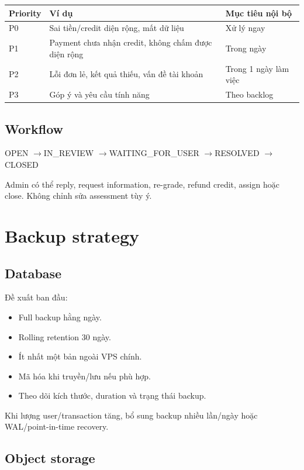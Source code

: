 \documentclass[11pt,a4paper]{article}
\newcommand{\arrow}{\ensuremath{\rightarrow}}
\begin{document}
\begin{longtable}{L{0.14\textwidth}L{0.48\textwidth}L{0.28\textwidth}}
\toprule
\textbf{Priority} & \textbf{Ví dụ} & \textbf{Mục tiêu nội bộ} \\
\midrule
P0 & Sai tiền/credit diện rộng, mất dữ liệu & Xử lý ngay \\
P1 & Payment chưa nhận credit, không chấm được diện rộng & Trong ngày \\
P2 & Lỗi đơn lẻ, kết quả thiếu, vấn đề tài khoản & Trong 1 ngày làm việc \\
P3 & Góp ý và yêu cầu tính năng & Theo backlog \\
\bottomrule
\end{longtable}

\subsection{Workflow}

\begin{flowbox}
OPEN \arrow IN\_REVIEW \arrow WAITING\_FOR\_USER \arrow RESOLVED \arrow CLOSED
\end{flowbox}

Admin có thể reply, request information, re-grade, refund credit, assign hoặc close. Không chỉnh sửa assessment tùy ý.

\section{Backup strategy}

\subsection{Database}

Đề xuất ban đầu:

\begin{itemize}
  \item Full backup hằng ngày.
  \item Rolling retention 30 ngày.
  \item Ít nhất một bản ngoài VPS chính.
  \item Mã hóa khi truyền/lưu nếu phù hợp.
  \item Theo dõi kích thước, duration và trạng thái backup.
\end{itemize}

Khi lượng user/transaction tăng, bổ sung backup nhiều lần/ngày hoặc WAL/point-in-time recovery.

\subsection{Object storage}
\end{document}

